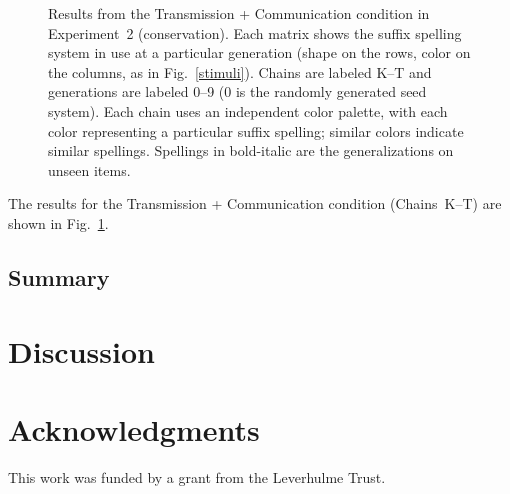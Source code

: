 \documentclass[doc,biblatex]{apa7}
\begin{document}
	\begin{figure}
	\vspace*{2pt}
	\caption{Results from the Transmission + Communication condition in Experiment~2 (conservation). Each matrix shows the suffix spelling system in use at a particular generation (shape on the rows, color on the columns, as in Fig.~\ref{stimuli}). Chains are labeled K--T and generations are labeled 0–9 (0 is the randomly generated seed system). Each chain uses an independent color palette, with each color representing a particular suffix spelling; similar colors indicate similar spellings. Spellings in bold-italic are the generalizations on unseen items.}
	\label{con_com}
	\end{figure}

The results for the Transmission + Communication condition (Chains~K--T) are shown in Fig.~\ref{con_com}.

\subsection{Summary}


\section{Discussion}


\section{Acknowledgments}

\noindent This work was funded by a grant from the Leverhulme Trust.

\printbibliography
\end{document}
